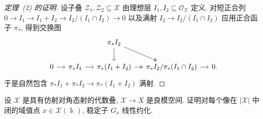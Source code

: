 \begin{proof}[定理~(2) 的证明]
设子叠 $\mathcal Z_1,\mathcal Z_2\subseteq\mathcal X$ 由理想层 $I_1,I_2\subseteq\mathcal O_{\mathcal X}$ 定义. 对短正合列 $0\to I_1\to I_1+I_2\to I_2/(I_1\cap I_2)\to0$ 以及满射 $I_2\to I_2/(I_1\cap I_2)$ 应用正合函子 $\pi_*$, 得到交换图
\begin{align*}
\begin{tikzcd}[ampersand replacement=\&,column sep=small]
\&\&\pi_*I_2\arrow[d]\arrow[dr,two heads]\&\\
0\arrow[r]\&\pi_*I_1\arrow[r]\&\pi_*(I_1+I_2)\arrow[r,two heads]\&\pi_*I_2/\pi_*(I_1\cap I_2)\arrow[r]\&0.
\end{tikzcd}
\end{align*}
于是自然包含 $\pi_*I_1+\pi_*I_2\to\pi_*(I_1+I_2)$ 满射.
\end{proof}
\begin{exercise}\label{src:7.5.27}
设 $\mathcal X$ 是具有仿射对角态射的代数叠, $\mathcal X\to X$ 是良模空间. 证明对每个像在 $|\mathcal X|$ 中闭的域值点 $x\in\mathcal X(\Bbbk)$, 稳定子 $G_x$ 线性约化.
\end{exercise}

